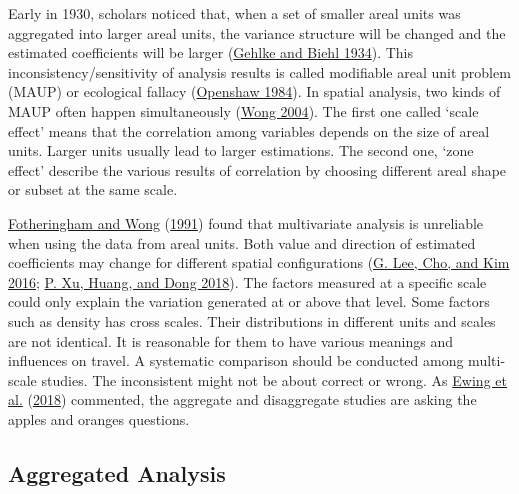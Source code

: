 \documentclass[
  11pt,
  openany]{memoir}
\begin{document}
Early in 1930, scholars noticed that, when a set of smaller areal units was aggregated into larger areal units, the variance structure will be changed and the estimated coefficients will be larger (\protect\hyperlink{ref-gehlkeCertainEffectsGrouping1934}{Gehlke and Biehl 1934}). This inconsistency/sensitivity of analysis results is called modifiable areal unit problem (MAUP) or ecological fallacy (\protect\hyperlink{ref-openshawEcologicalFallaciesAnalysis1984}{Openshaw 1984}).
In spatial analysis, two kinds of MAUP often happen simultaneously (\protect\hyperlink{ref-wongModifiableArealUnit2004}{Wong 2004}). The first one called `scale effect' means that the correlation among variables depends on the size of areal units. Larger units usually lead to larger estimations. The second one, `zone effect' describe the various results of correlation by choosing different areal shape or subset at the same scale.

\protect\hyperlink{ref-fotheringhamModifiableArealUnit1991}{Fotheringham and Wong} (\protect\hyperlink{ref-fotheringhamModifiableArealUnit1991}{1991}) found that multivariate analysis is unreliable when using the data from areal units. Both value and direction of estimated coefficients may change for different spatial configurations (\protect\hyperlink{ref-leeModifiableArealUnit2016}{G. Lee, Cho, and Kim 2016}; \protect\hyperlink{ref-xuModifiableArealUnit2018}{P. Xu, Huang, and Dong 2018}).
The factors measured at a specific scale could only explain the variation generated at or above that level. Some factors such as density has cross scales. Their distributions in different units and scales are not identical. It is reasonable for them to have various meanings and influences on travel. A systematic comparison should be conducted among multi-scale studies. The inconsistent might not be about correct or wrong. As \protect\hyperlink{ref-ewingTestingNewmanKenworthy2018}{Ewing et al.} (\protect\hyperlink{ref-ewingTestingNewmanKenworthy2018}{2018}) commented, the aggregate and disaggregate studies are asking the apples and oranges questions.

\hypertarget{aggregated-analysis}{%
\subsection{Aggregated Analysis}\label{aggregated-analysis}}
\end{document}
